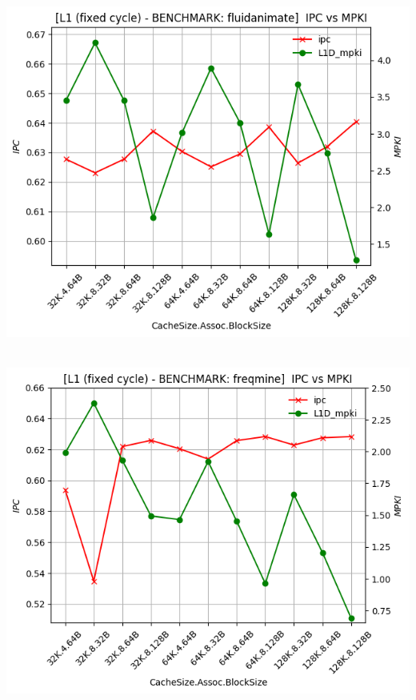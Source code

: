 \begin{minipage}{\textwidth}
    \begin{center}
        \\
        \vspace{3mm}
        \includegraphics[scale=0.70]{graphs/L1/fixed/fluidanimate.png}
        \vspace{6mm}
    \end{center}
\end{minipage}

\begin{minipage}{\textwidth}
    \begin{center}
        \\
        \vspace{3mm}
        \includegraphics[scale=0.70]{graphs/L1/fixed/freqmine.png}
        \vspace{6mm}
    \end{center}
\end{minipage}

